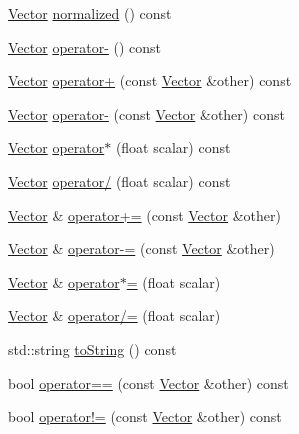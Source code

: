 \begin{DoxyCompactItemize}
\item 
\hyperlink{struct_leap_1_1_vector}{Vector} \hyperlink{struct_leap_1_1_vector_a23d7640c4797fb84367272d4ebd88e8a}{normalized} () const 
\item 
\hyperlink{struct_leap_1_1_vector}{Vector} \hyperlink{struct_leap_1_1_vector_a05564e30c0301990e6f5ecea81fc0f4a}{operator-\/} () const 
\item 
\hyperlink{struct_leap_1_1_vector}{Vector} \hyperlink{struct_leap_1_1_vector_ae5f8d3473a15cff36a610e3f339c7423}{operator+} (const \hyperlink{struct_leap_1_1_vector}{Vector} \&other) const 
\item 
\hyperlink{struct_leap_1_1_vector}{Vector} \hyperlink{struct_leap_1_1_vector_a4a729e5a27fe13d3c71a7a9fd3e234e3}{operator-\/} (const \hyperlink{struct_leap_1_1_vector}{Vector} \&other) const 
\item 
\hyperlink{struct_leap_1_1_vector}{Vector} \hyperlink{struct_leap_1_1_vector_adfac06b2c9a9936f62da4b293ef98db3}{operator$\ast$} (float scalar) const 
\item 
\hyperlink{struct_leap_1_1_vector}{Vector} \hyperlink{struct_leap_1_1_vector_a23a7ee5a8da0f282e51628ac3fc59f70}{operator/} (float scalar) const 
\item 
\hyperlink{struct_leap_1_1_vector}{Vector} \& \hyperlink{struct_leap_1_1_vector_ac2dbd10e09399bc5679ceee380cff2cc}{operator+=} (const \hyperlink{struct_leap_1_1_vector}{Vector} \&other)
\item 
\hyperlink{struct_leap_1_1_vector}{Vector} \& \hyperlink{struct_leap_1_1_vector_a71f56cf12c752f001d44c6a9ed3c15db}{operator-\/=} (const \hyperlink{struct_leap_1_1_vector}{Vector} \&other)
\item 
\hyperlink{struct_leap_1_1_vector}{Vector} \& \hyperlink{struct_leap_1_1_vector_a3c07a9eb80762ca448a78650500f06a8}{operator$\ast$=} (float scalar)
\item 
\hyperlink{struct_leap_1_1_vector}{Vector} \& \hyperlink{struct_leap_1_1_vector_a0c83e9d07018bdb3b3404088939a050d}{operator/=} (float scalar)
\item 
std\+::string \hyperlink{struct_leap_1_1_vector_a06f42a3c10c886b449e6db32a565099c}{to\+String} () const 
\item 
bool \hyperlink{struct_leap_1_1_vector_a3055b0255b5d4af0a51ceacd93187218}{operator==} (const \hyperlink{struct_leap_1_1_vector}{Vector} \&other) const 
\item 
bool \hyperlink{struct_leap_1_1_vector_abf6930c4b2ed673408d86194626577b0}{operator!=} (const \hyperlink{struct_leap_1_1_vector}{Vector} \&other) const 

\end{DoxyCompactItemize}
